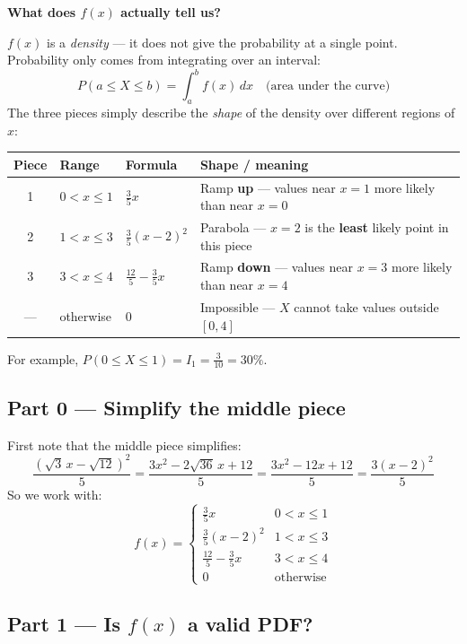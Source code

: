 \documentclass[12pt, a4paper]{article}
\begin{document}
\begin{notebox}
\textbf{What does $f(x)$ actually tell us?}

$f(x)$ is a \emph{density} — it does not give the probability at a single point.
Probability only comes from integrating over an interval:
\[
  P(a \leq X \leq b) = \int_a^b f(x)\,dx \quad \text{(area under the curve)}
\]
The three pieces simply describe the \emph{shape} of the density over different regions of $x$:

\medskip
\renewcommand{\arraystretch}{1.5}
\begin{tabular}{clll}
  \hline
  \textbf{Piece} & \textbf{Range} & \textbf{Formula} & \textbf{Shape / meaning} \\
  \hline
  1 & $0 < x \leq 1$ & $\tfrac{3}{5}x$ & Ramp \textbf{up} — values near $x=1$ more likely than near $x=0$ \\
  2 & $1 < x \leq 3$ & $\tfrac{3}{5}(x-2)^2$ & Parabola — $x=2$ is the \textbf{least} likely point in this piece \\
  3 & $3 < x \leq 4$ & $\tfrac{12}{5}-\tfrac{3}{5}x$ & Ramp \textbf{down} — values near $x=3$ more likely than near $x=4$ \\
  — & otherwise & $0$ & Impossible — $X$ cannot take values outside $[0,4]$ \\
  \hline
\end{tabular}

\medskip
For example, $P(0 \leq X \leq 1) = I_1 = \tfrac{3}{10} = 30\%$.
\end{notebox}

\subsection*{Part 0 --- Simplify the middle piece}

First note that the middle piece simplifies:
\[
  \frac{(\sqrt{3}\,x - \sqrt{12})^2}{5}
  = \frac{3x^2 - 2\sqrt{36}\,x + 12}{5}
  = \frac{3x^2 - 12x + 12}{5}
  = \frac{3(x-2)^2}{5}
\]
So we work with:
\[
  f(x) =
  \begin{cases}
    \tfrac{3}{5}x           & 0 < x \leq 1 \\
    \tfrac{3}{5}(x-2)^2     & 1 < x \leq 3 \\
    \tfrac{12}{5}-\tfrac{3}{5}x & 3 < x \leq 4 \\
    0 & \text{otherwise}
  \end{cases}
\]

\subsection*{Part 1 --- Is $f(x)$ a valid PDF?}
\end{document}

